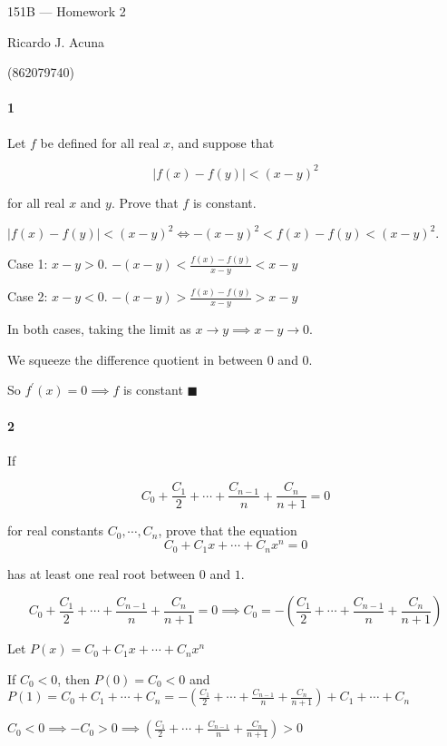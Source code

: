 \documentclass{article}
\begin{document}
\begin{center}
  151B --- Homework 2

  Ricardo J. Acuna

  (862079740)
\end{center}\vspace{1.618em}

\paragraph{1} Let $f$ be defined for all real $x$, and suppose that

\[|f(x)-f(y)|<(x-y)^2\]

for all real $x$ and $y$. Prove that $f$ is constant.


$|f(x)-f(y)| < (x-y)^2 \iff -(x-y)^2 < f(x)-f(y)< (x-y)^2$.

Case 1: $x-y > 0$.
$-(x-y) < \frac{f(x)-f(y)}{x-y} < x-y$

Case 2: $x-y < 0$.
$-(x-y) > \frac{f(x)-f(y)}{x-y} > x-y$

In both cases, taking the limit as $x\rightarrow y\implies  x-y
\rightarrow 0$.

We squeeze the difference quotient in between $0$ and $0$.

So $f^\prime(x) = 0 \implies f$ is constant
$\blacksquare$

\newpage

\paragraph{2} If

\[C_0 +\frac{C_1}{2}+\cdots + \frac{C_{n-1}}{n} +\frac{C_n}{n+1} = 0\]

for real constants $C_0,\cdots,C_n$, prove that the equation
\[C_0 +C_1 x+\cdots+C_n x^n = 0\]

has at least one real root between $0$ and $1$.


\[C_0 +\frac{C_1}{2}+\cdots + \frac{C_{n-1}}{n} +\frac{C_n}{n+1} = 0 \implies C_0 = -(\frac{C_1}{2}+\cdots + \frac{C_{n-1}}{n}
  +\frac{C_n}{n+1})\]

Let $P(x) = C_0 +C_1 x+\cdots+C_n x^n$

If $C_0 <0$, then $P(0) = C_0 < 0$
and
$P(1) = C_0 + C_1+ \cdots + C_n = -(\frac{C_1}{2}+\cdots + \frac{C_{n-1}}{n}
+\frac{C_n}{n+1})+ C_1+ \cdots + C_n$


$C_0<0 \implies -C_0 > 0 \implies (\frac{C_1}{2}+\cdots + \frac{C_{n-1}}{n}
+\frac{C_n}{n+1}) > 0$
\end{document}
